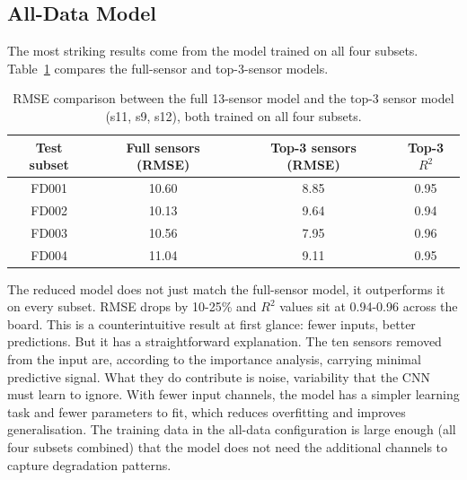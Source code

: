 \subsection{All-Data Model}
The most striking results come from the model trained on all four subsets. Table~\ref{tab:rmse_all} compares the full-sensor and top-3-sensor models.
%
\begin{table}[ht]
    \centering
    \begin{tabular}{c c c c}
        \toprule
        Test subset & Full sensors (RMSE) & Top-3 sensors (RMSE) & Top-3 $R^2$ \\
        \midrule
        FD001 & 10.60 & 8.85  & 0.95 \\
        FD002 & 10.13 & 9.64  & 0.94 \\
        FD003 & 10.56 & 7.95  & 0.96 \\
        FD004 & 11.04 & 9.11  & 0.95 \\
        \bottomrule
    \end{tabular}
    \caption{RMSE comparison between the full 13-sensor model and the top-3 sensor model (s11, s9, s12), both trained on all four subsets.}
    \label{tab:rmse_all}
\end{table}
%
The reduced model does not just match the full-sensor model, it outperforms it on every subset. RMSE drops by 10-25\% and $R^2$ values sit at 0.94-0.96 across the board. This is a counterintuitive result at first glance: fewer inputs, better predictions. But it has a straightforward explanation. The ten sensors removed from the input are, according to the importance analysis, carrying minimal predictive signal. What they do contribute is noise, variability that the CNN must learn to ignore. With fewer input channels, the model has a simpler learning task and fewer parameters to fit, which reduces overfitting and improves generalisation. The training data in the all-data configuration is large enough (all four subsets combined) that the model does not need the additional channels to capture degradation patterns.

